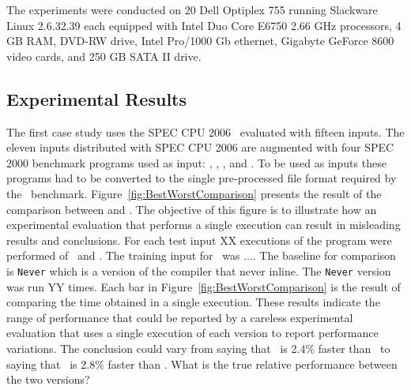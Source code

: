 
The experiments were conducted on $20$ Dell Optiplex 755 running Slackware Linux 2.6.32.39 each equipped with Intel Duo Core E6750 2.66 GHz processors, 4 GB RAM, DVD-RW drive, Intel Pro/1000 Gb ethernet, Gigabyte GeForce 8600 video cards, and 250 GB SATA II drive. 

\subsection {Experimental Results}

The first case study uses the SPEC CPU 2006  \gcc\ evaluated with fifteen inputs. The eleven inputs distributed with SPEC CPU 2006 are augmented with  four SPEC 2000 benchmark programs used as input: \bzip, \lbm, \mcf, and \parser. To be used as inputs these programs had to be converted to the single pre-processed file format required by the \gcc\ benchmark.
Figure~\ref{fig:BestWorstComparison}  presents the result of the comparison between \llvm and \FDI. The objective of this figure is to illustrate how an experimental evaluation that performs a single execution can result in misleading results and conclusions. For each test input XX executions of the program were performed of \FDI\ and \llvm. The training input for \FDI\ was .... The baseline for comparison is  {\tt Never} which is a version of the compiler that never inline. The {\tt Never} version was run YY times. Each bar in Figure~\ref{fig:BestWorstComparison} is the result of comparing the time obtained in a single execution. These results indicate the range of performance that could be reported by a careless experimental evaluation that uses a single execution of each version to report performance variations. The conclusion could vary from saying that \FDI\ is 2.4\% faster than \llvm\ to saying that \llvm\ is 2.8\% faster than \FDI. What is the true relative performance between the two versions?
 


